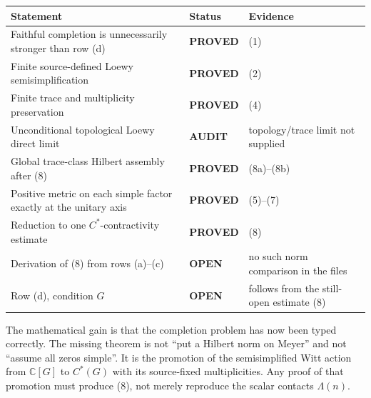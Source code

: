 \documentclass[11pt]{article}
\newcommand{\PROVED}{\textcolor{green!40!black}{\textbf{PROVED}}}
\newcommand{\OPEN}{\textcolor{red!70!black}{\textbf{OPEN}}}
\newcommand{\AUDIT}{\textcolor{orange!70!black}{\textbf{AUDIT}}}
\begin{document}
\begin{center}
\begin{tabular}{>{\raggedright\arraybackslash}p{.55\linewidth}
                >{\centering\arraybackslash}p{.16\linewidth}
                >{\raggedright\arraybackslash}p{.20\linewidth}}
\toprule
Statement & Status & Evidence \\
\midrule
Faithful completion is unnecessarily stronger than row (d) & \PROVED & (1) \\
Finite source-defined Loewy semisimplification & \PROVED & (2) \\
Finite trace and multiplicity preservation & \PROVED & (4) \\
Unconditional topological Loewy direct limit & \AUDIT & topology/trace limit not supplied \\
Global trace-class Hilbert assembly after (8) & \PROVED & (8a)--(8b) \\
Positive metric on each simple factor exactly at the unitary axis & \PROVED & (5)--(7) \\
Reduction to one $C^*$-contractivity estimate & \PROVED & (8) \\
Derivation of (8) from rows (a)--(c) & \OPEN & no such norm comparison in the files \\
Row (d), condition $G$ & \OPEN & follows from the still-open estimate (8) \\
\bottomrule
\end{tabular}
\end{center}

The mathematical gain is that the completion problem has now been typed
correctly.  The missing theorem is not ``put a Hilbert norm on Meyer'' and
not ``assume all zeros simple''.  It is the promotion of the
semisimplified Witt action from $\mathbb C[G]$ to $C^*(G)$ with its
source-fixed multiplicities.  Any proof of that promotion must produce
(8), not merely reproduce the scalar contacts $\Lambda(n)$.
\end{document}
